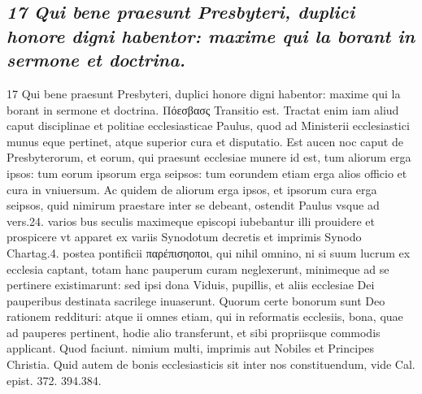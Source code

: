 \documentclass{article}
\begin{document}
\begin{pages}
\subsection*{\textit{17 Qui bene praesunt Presbyteri, duplici honore digni habentor: maxime qui la borant in sermone et doctrina.}}17 Qui bene praesunt Presbyteri, duplici honore digni habentor: maxime qui la borant in sermone et doctrina. Πόεσβασς Transitio est. Tractat enim iam aliud caput disciplinae et politiae ecclesiasticae Paulus, quod ad Ministerii ecclesiastici munus eque pertinet, atque superior cura et disputatio. Est aucen noc caput de Presbyterorum, et eorum, qui praesunt ecclesiae munere id est, tum aliorum erga ipsos: tum eorum ipsorum erga seipsos: tum eorundem etiam erga alios officio et cura in vniuersum. Ac quidem de aliorum erga ipsos, et ipsorum cura erga seipsos, quid nimirum praestare inter se debeant, ostendit Paulus vsque ad vers.24. varios  \pend\pstart bus seculis maximeque episcopi iubebantur illi prouidere et prospicere vt apparet ex variis Synodotum decretis et imprimis Synodo Chartag.4. postea pontificii παρέπισηοποι, qui nihil omnino, ni si suum lucrum ex ecclesia captant, totam hanc pauperum curam neglexerunt, minimeque ad se pertinere existimarunt: sed ipsi dona Viduis, pupillis, et aliis ecclesiae Dei pauperibus destinata sacrilege inuaserunt. Quorum certe bonorum sunt Deo rationem reddituri: atque ii omnes etiam, qui in reformatis ecclesiis, bona, quae ad pauperes pertinent, hodie alio transferunt, et sibi propriisque commodis applicant. Quod faciunt. nimium multi, imprimis aut Nobiles et Principes Christia. Quid autem de bonis ecclesiasticis sit inter nos constituendum, vide Cal. epist. 372. 394.384.  \pend

\end{pages}
\end{document}
